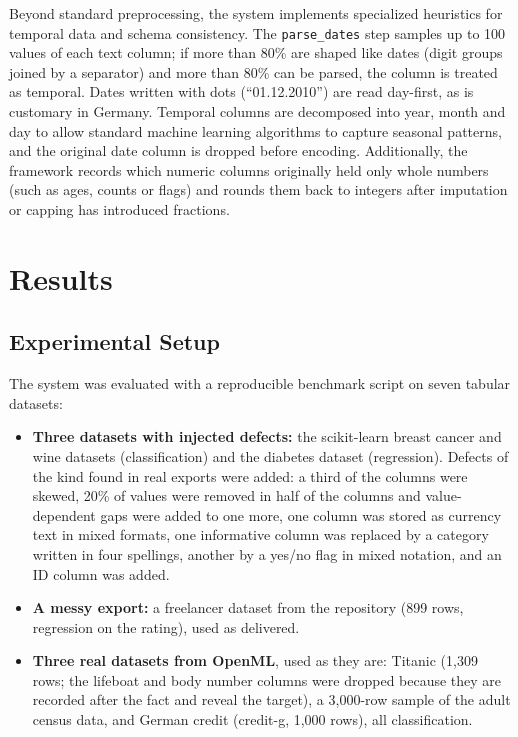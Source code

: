 \documentclass[11pt,a4paper]{article}
\begin{document}
Beyond standard preprocessing, the system implements specialized heuristics for temporal data and schema consistency. The \texttt{parse\_dates} step samples up to 100 values of each text column; if more than 80\% are shaped like dates (digit groups joined by a separator) and more than 80\% can be parsed, the column is treated as temporal. Dates written with dots (``01.12.2010'') are read day-first, as is customary in Germany. Temporal columns are decomposed into year, month and day to allow standard machine learning algorithms to capture seasonal patterns, and the original date column is dropped before encoding. Additionally, the framework records which numeric columns originally held only whole numbers (such as ages, counts or flags) and rounds them back to integers after imputation or capping has introduced fractions.


\section{Results}

\subsection{Experimental Setup}

The system was evaluated with a reproducible benchmark script on seven tabular datasets:

\begin{itemize}
    \item \textbf{Three datasets with injected defects:} the scikit-learn breast cancer and wine datasets (classification) and the diabetes dataset (regression). Defects of the kind found in real exports were added: a third of the columns were skewed, 20\% of values were removed in half of the columns and value-dependent gaps were added to one more, one column was stored as currency text in mixed formats, one informative column was replaced by a category written in four spellings, another by a yes/no flag in mixed notation, and an ID column was added.
    \item \textbf{A messy export:} a freelancer dataset from the repository (899 rows, regression on the rating), used as delivered.
    \item \textbf{Three real datasets from OpenML}, used as they are: Titanic (1,309 rows; the lifeboat and body number columns were dropped because they are recorded after the fact and reveal the target), a 3,000-row sample of the adult census data, and German credit (credit-g, 1,000 rows), all classification.
\end{itemize}
\end{document}
